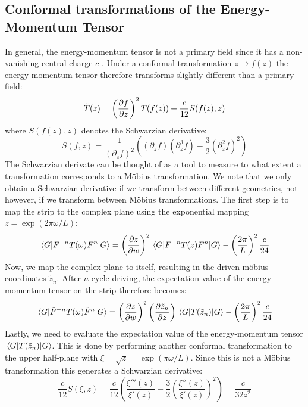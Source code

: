 \documentclass[11pt, a4paper, oneside]{book}
\theoremstyle{definition} %
\begin{document}
\subsection{Conformal transformations of the Energy-Momentum Tensor}
In general, the energy-momentum tensor is not a primary field since it has a non-vanishing central charge $c$ \cite{Ginsparg}. Under a conformal transformation $z \rightarrow f(z)$ the energy-momentum tensor therefore transforms slightly different than a primary field:
\begin{equation}
	\Tilde{T}(z) = \left( \pdv{f}{z}\right)^2 T(f(z)) + \frac{c}{12} S(f(z),z)
\end{equation}
where $S(f(z),z)$ denotes the Schwarzian derivative:
\begin{equation}
	S(f,z) = \frac{1}{(\partial_z f)^2}\left( (\partial_z f) (\partial_z^3 f) - \frac{3}{2}(\partial_z^2 f)^2\right)
\end{equation}
The Schwarzian derivate can be thought of as a tool to measure to what extent a transformation corresponds to a Möbius transformation. We note that we only obtain a Schwarzian derivative if we transform between different geometries, not however, if we transform between Möbius transformations. The first step is to map the strip to the complex plane using the exponential mapping $z = \exp(2\pi \omega/L)$:
\begin{equation}
	\mel{G}{F^{-n} T(\omega) F^{n}}{G} = \left(\pdv{z}{w}\right)^2 \mel{G}{F^{-n} T(z) F^{n}}{G} - \left( \frac{2 \pi}{L}\right)^2 \frac{c}{24}
\end{equation}
Now, we map the complex plane to itself, resulting in the driven möbius coordinates $\tilde{z}_n$. After $n$-cycle driving, the expectation value of the energy-momentum tensor on the strip therefore becomes:
\begin{equation}
	\mel{G}{\hat{F}^{-n} T(\omega) \hat{F}^n}{G} = \left(\pdv{z}{w}\right)^2 \left(\pdv{\tilde{z}_n}{z}\right) \mel{G}{T(\tilde{z}_n)}{G}- \left(\frac{2\pi}{L}\right)^2 \frac{c}{24}
\end{equation}
Lastly, we need to evaluate the expectation value of the energy-momentum tensor $\mel{G}{T(\tilde{z}_n)}{G}$. This is done by performing another conformal transformation to the upper half-plane with $\xi = \sqrt{z} = \exp(\pi \omega /L)$. Since this is not a Möbius transformation this generates a Schwarzian derivative:
\begin{equation}
	\frac{c}{12}S(\xi,z) =  \frac{c}{12} \left( \frac{\xi'''(z)}{\xi'(z)} - \frac{3}{2} \left( \frac{\xi''(z)}{\xi'(z)}\right)^2 \right) = \frac{c}{32z^2}
\end{equation}
\end{document}
